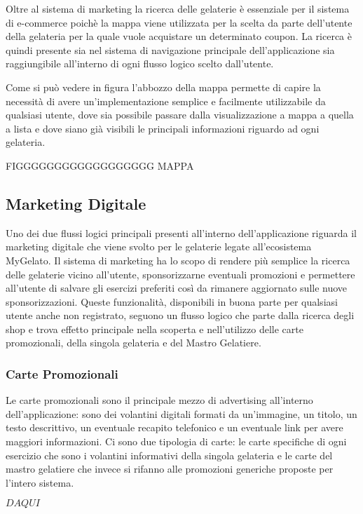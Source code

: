 Oltre al sistema di marketing la ricerca delle gelaterie è essenziale per il sistema di e-commerce poichè la mappa viene utilizzata per la scelta da parte dell'utente della gelateria per la quale vuole acquistare un determinato coupon.
La ricerca è quindi presente sia nel sistema di navigazione principale dell'applicazione sia raggiungibile all'interno di ogni flusso logico scelto dall'utente.

Come si può vedere in figura l'abbozzo della mappa permette di capire la necessità di avere un'implementazione semplice e facilmente utilizzabile da qualsiasi utente, dove sia possibile passare dalla visualizzazione a mappa a quella a lista e dove siano già visibili le principali informazioni riguardo ad ogni gelateria.


FIGGGGGGGGGGGGGGGGGG MAPPA


\subsection{Marketing Digitale}
Uno dei due flussi logici principali presenti all'interno dell'applicazione riguarda il marketing digitale che viene svolto per le gelaterie legate all'ecosistema MyGelato.
Il sistema di marketing ha lo scopo di rendere più semplice la ricerca delle gelaterie vicino all'utente, sponsorizzarne eventuali promozioni e permettere all'utente di salvare gli esercizi preferiti così da rimanere aggiornato sulle nuove sponsorizzazioni.
Queste funzionalità, disponibili in buona parte per qualsiasi utente anche non registrato, seguono un flusso logico che parte dalla ricerca degli shop e trova effetto principale nella scoperta e nell'utilizzo delle carte promozionali, della singola gelateria e del Mastro Gelatiere.

\subsubsection{Carte Promozionali}
Le carte promozionali sono il principale mezzo di advertising all'interno dell'applicazione: sono dei volantini digitali formati da un'immagine, un titolo, un testo descrittivo, un eventuale recapito telefonico e un eventuale link per avere maggiori informazioni.
Ci sono due tipologia di carte: le carte specifiche di ogni esercizio che sono i volantini informativi della singola gelateria e le carte del mastro gelatiere che invece si rifanno alle promozioni generiche proposte per l'intero sistema.

$ DA QUI  $




